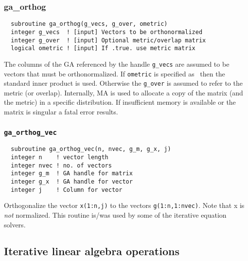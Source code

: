 \subsubsection{{ga\_orthog}}
\begin{verbatim}
  subroutine ga_orthog(g_vecs, g_over, ometric)
  integer g_vecs  ! [input] Vectors to be orthonormalized
  integer g_over  ! [input] Optional metric/overlap matrix
  logical ometric ! [input] If .true. use metric matrix
\end{verbatim}
The columns of the GA referenced by the handle \verb+g_vecs+ are
assumed to be vectors that must be orthonormalized.  If \verb+ometric+
is specified as \FALSE\ then the standard inner product is used.
Otherwise the \verb+g_over+ is assumed to refer to the metric (or
overlap).  Internally, MA is used to allocate a copy of the matrix
(and the metric) in a specific distribution.  If insufficient memory
is available or the matrix is singular a fatal error results.

\subsubsection{{\tt ga\_orthog\_vec}}
\begin{verbatim}
  subroutine ga_orthog_vec(n, nvec, g_m, g_x, j) 
  integer n    ! vector length 
  integer nvec ! no. of vectors 
  integer g_m  ! GA handle for matrix 
  integer g_x  ! GA handle for vector 
  integer j    ! Column for vector
\end{verbatim}
Orthogonalize the vector \verb+x(1:n,j)+ to the vectors
\verb+g(1:n,1:nvec)+.  Note that x is {\em not} normalized.  This routine
is/was used by some of the iterative equation solvers.

\subsection{Iterative linear algebra operations}

